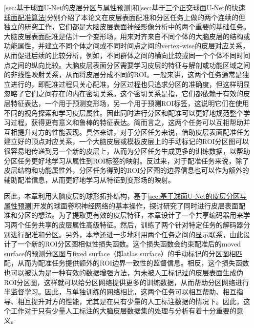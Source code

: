 \ref{sec:基于球面U-Net的皮层分区与属性预测}和\ref{sec:基于三个正交球面U-Net的快速球面配准算法}分别介绍了本论文在皮层表面配准和分区任务上做的两个连续的但独立的研究工作，它们都是大脑皮层表面神经影像分析中的两个重要的基础任务。大脑皮层表面配准是估计一个变形场，用来对齐来自不同个体的大脑皮层的结构或功能属性，并建立不同个体之间或不同时间点之间的vertex-wise的皮层对应关系\cite{fischl1999high,yeo2009spherical,zhao2020unsupervised}，从而促进后续的比较分析，例如，不同群体之间的横向比较或同一个个体不同时间点之间的纵向比较。大脑皮层表面分区需要学习皮层的特征与解剖或功能区域之间的非线性映射关系，从而将皮层分成不同的ROI\cite{desikan2006automated,zhao2021sphericalDeformable,wu2018registration}。一般来讲，这两个任务通常是独立进行的\cite{li2019computational}，即配准过程只关心配准，分区过程也只追求分区的准确度，但这样明显忽略了它们之间存在的内在密切关系。这个密切关系是指，它们都依赖于有效的皮层特征表达，一个用于预测变形场，另一个用于预测ROI标签，这说明它们在使用不同的视角探索和学习皮层属性。因此同时进行分区和配准可以更好地规范整个学习过程，获得更有意义和鲁棒的特征表达。简而言之，这两个任务可以互相帮助并互相提升对方的性能表现。具体来讲，对于分区任务来说，借助皮层表面配准任务建立好的顶点对应关系，一个大脑皮层或模板皮层上的手动标记的ROI分区图可以很容易地传递到另一个新的皮层上，从而为分区任务生成更多的训练数据，以帮助分区任务更好地学习从属性到ROI标签的映射。反过来，对于配准任务来说，除了皮层结构和功能属性外，分区任务得到的ROI分区图的边界信息也可以作为额外的辅助配准信息，从而更好地学习从特征到变形场的映射。

因此，本章利用大脑皮层的球形拓扑结构，基于\ref{sec:基于球面U-Net的皮层分区与属性预测}开发的球面卷积神经网络的基本操作，探讨研究了同时进行皮层表面配准和分区的想法。为了提取更有效的皮层特征，本章设计了一个共享编码器用来学习两个任务共享的皮层属性高级特征。然后，训练了两个针对特定任务的解码器分别进行配准和分区。另外，本章还进一步地利用两个任务之间的显示联系，由此设计了一个新的ROI分区图相似性损失函数。这个损失函数会约束配准后的moved surface的预测分区图与fixed surface（即atlas surface）的手动标记的分区图相匹配，从而为配准任务提供额外的ROI边界一致性的监督信息。相反，这个损失函数也可以被认为是一种有效的数据增强方法，为未被人工标记过的皮层表面生成伪ROI分区图，这样就可以给分区网络提供更多的训练数据，从而帮助分区网络进行半监督学习\cite{xu2019deepatlas}。因此，与单独训练的网络相比，这两个任务可以相互帮助、相互指导、相互提升对方的性能，尤其是在只有少量的人工标注数据的情况下。因此，这个工作对于只有少量人工标注的大脑皮层数据集的处理与分析有着十分重要的意义。

